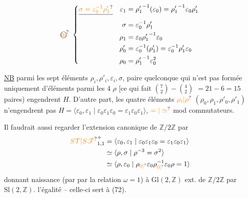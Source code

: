 \[\text{\textcircled{\unsure{m}}}\ \left\{\begin{aligned}
\deleted{\unsure{\sigma=\varepsilon_0^{-1}\rho'_1}}\quad \varepsilon_1&={\rho'_1}^{-1}(\varepsilon_0)={\rho'_1}^{-1}\varepsilon_0\rho'_1\\
\sigma&=\varepsilon_0^{-1}\rho'_1\\
\rho_1&=\varepsilon_0{\rho'_1}^{-1}\varepsilon_0\\
\rho'_0&=\varepsilon_0^{-1}(\rho'_1)=\varepsilon_0^{-1}\rho'_1\varepsilon_0\\
\rho_0&={\rho'_1}^{-1}\varepsilon_0^2
\end{aligned}\right.\]

\uline{NB} parmi les sept éléments $\rho_i,\rho'_i,\varepsilon_i,\sigma$,  
paire quelconque qui n'est pas formée uniquement
d'éléments parmi les 4 $\rho$ [ce qui fait $\binom{7}{2}-\binom{4}{2}$
$=21-6=15$ paires) engendrent $H$. D'autre part,
les quatre éléments $\unsure{\rho_i|\rho}$ $(\rho_0,\rho_1,\rho'_0,\rho'_1)$ n'engendrent
pas $H=\langle \varepsilon_0,\varepsilon_1\mid \varepsilon_0\varepsilon_1\varepsilon_0=\varepsilon_1\varepsilon_0\varepsilon_1\rangle$,  $\unsure{=|\simeq}$ mod commutateurs.

Il faudrait aussi regarder l'extension canonique
de $\mathbb{Z}/2\mathbb{Z}$ par
\[\begin{aligned}
\unsure{S\mathcal{T}|S\mathscr{T}}_{1,1}^+&=\langle \varepsilon_0,\varepsilon_1\mid \varepsilon_0\varepsilon_1\varepsilon_0=\varepsilon_1\varepsilon_0\varepsilon_1\rangle\\
&\simeq\langle\rho,\sigma\mid \rho^{-3}=\sigma^2\rangle\\
&\simeq\langle\rho,\varepsilon_0\mid \rho_{\unsure{0|\vphantom{0}}}\varepsilon_0\rho_{\unsure{0|\vphantom{0}}}^{-1}\varepsilon_0\rho=1\rangle
\end{aligned}\]
donnant naissance (par  par la relation $\omega=1$)
à $\mathrm{Gl}(2,\mathbb{Z})$ ext. de $\mathbb{Z}/2\mathbb{Z}$ par $\mathrm{Sl}(2,\mathbb{Z})$.
 l'égalité -- celle-ci sert à  (72).

